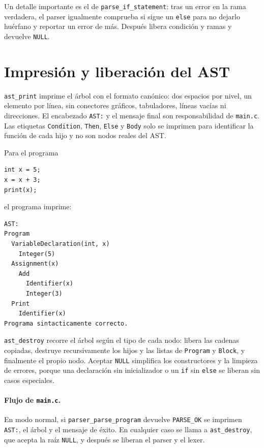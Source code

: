 \documentclass[12pt,letterpaper]{article}
\begin{document}
Un detalle importante es el de \texttt{parse\_if\_statement}: tras un error en la rama verdadera, el parser
igualmente comprueba si sigue un \texttt{else} para no dejarlo huérfano y reportar un error de más. Después
libera condición y ramas y devuelve \texttt{NULL}.


\section*{Impresión y liberación del AST}

\texttt{ast\_print} imprime el árbol con el formato canónico: dos espacios por nivel, un elemento por línea,
sin conectores gráficos, tabuladores, líneas vacías ni direcciones. El encabezado \texttt{AST:} y el mensaje
final son responsabilidad de \texttt{main.c}. Las etiquetas \texttt{Condition}, \texttt{Then}, \texttt{Else} y
\texttt{Body} solo se imprimen para identificar la función de cada hijo y no son nodos reales del AST.

Para el programa

\begin{verbatim}
int x = 5;
x = x + 3;
print(x);
\end{verbatim}

el programa imprime:

\begin{verbatim}
AST:
Program
  VariableDeclaration(int, x)
    Integer(5)
  Assignment(x)
    Add
      Identifier(x)
      Integer(3)
  Print
    Identifier(x)
Programa sintacticamente correcto.
\end{verbatim}

\texttt{ast\_destroy} recorre el árbol según el tipo de cada nodo: libera las cadenas copiadas, destruye
recursivamente los hijos y las listas de \texttt{Program} y \texttt{Block}, y finalmente el propio nodo.
Aceptar \texttt{NULL} simplifica los constructores y la limpieza de errores, porque una declaración sin
inicializador o un \texttt{if} sin \texttt{else} se liberan sin casos especiales.

\paragraph{Flujo de \texttt{main.c}.} En modo normal, si \texttt{parser\_parse\_program} devuelve
\texttt{PARSE\_OK} se imprimen \texttt{AST:}, el árbol y el mensaje de éxito. En cualquier caso se llama a
\texttt{ast\_destroy}, que acepta la raíz \texttt{NULL}, y después se liberan el parser y el lexer.
\end{document}
